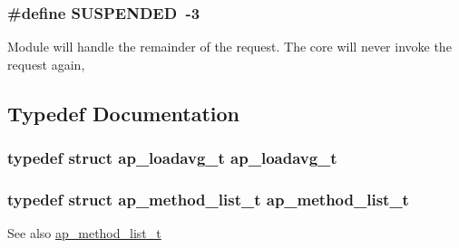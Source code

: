 \subsubsection[{\texorpdfstring{S\+U\+S\+P\+E\+N\+D\+ED}{SUSPENDED}}]{\setlength{\rightskip}{0pt plus 5cm}\#define S\+U\+S\+P\+E\+N\+D\+ED~-\/3}\hypertarget{group__APACHE__CORE__DAEMON_gaeb2de2a76ea6728368042cf7a3fcd60c}{}\label{group__APACHE__CORE__DAEMON_gaeb2de2a76ea6728368042cf7a3fcd60c}
Module will handle the remainder of the request. The core will never invoke the request again, 

\subsection{Typedef Documentation}
\subsubsection[{\texorpdfstring{ap\+\_\+loadavg\+\_\+t}{ap_loadavg_t}}]{\setlength{\rightskip}{0pt plus 5cm}typedef struct {\bf ap\+\_\+loadavg\+\_\+t} {\bf ap\+\_\+loadavg\+\_\+t}}\hypertarget{group__APACHE__CORE__DAEMON_ga3be00350e7092a1e1efcc2bd911871fc}{}\label{group__APACHE__CORE__DAEMON_ga3be00350e7092a1e1efcc2bd911871fc}
\subsubsection[{\texorpdfstring{ap\+\_\+method\+\_\+list\+\_\+t}{ap_method_list_t}}]{\setlength{\rightskip}{0pt plus 5cm}typedef struct {\bf ap\+\_\+method\+\_\+list\+\_\+t} {\bf ap\+\_\+method\+\_\+list\+\_\+t}}\hypertarget{group__APACHE__CORE__DAEMON_ga824fa57f315a0d50a7b56498c38939a3}{}\label{group__APACHE__CORE__DAEMON_ga824fa57f315a0d50a7b56498c38939a3}
\begin{DoxySeeAlso}{See also}
\hyperlink{structap__method__list__t}{ap\+\_\+method\+\_\+list\+\_\+t} 
\end{DoxySeeAlso}
